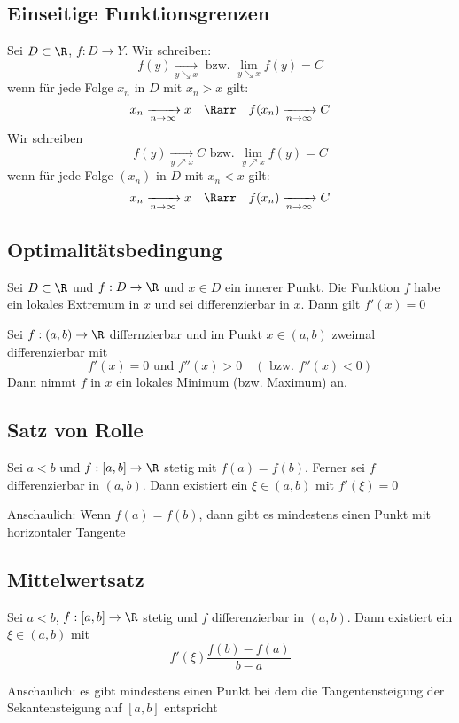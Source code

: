 	\subsection{Einseitige Funktionsgrenzen}
		\begin{Definition} 
			Sei $D\subset \R$, $f:D \to Y$. Wir schreiben:
			$$
				f(y)\xrightarrow[y\searrow x]{} \text{ bzw. } \lim_{y\searrow x}f(y) = C
			$$
			wenn für jede Folge $x_n$ in $D$ mit $x_n > x$ gilt:
			$$
				x_n \xrightarrow[n\to\infty]{}x \quad \Rarr \quad f(x_n)\xrightarrow[n\to\infty]{}C
			$$
			Wir schreiben
			$$
				f(y)\xrightarrow[y\nearrow x]{}C \text{ bzw. } \lim_{y\nearrow x}f(y)=C
			$$
			wenn für jede Folge $(x_n)$ in $D$ mit $x_n < x$ gilt:
			$$
				x_n\xrightarrow[n\to\infty]{}x \quad \Rarr \quad f(x_n)\xrightarrow[n\to\infty]{}C
			$$
		\end{Definition}
	\subsection{Optimalitätsbedingung}
		\begin{Satz} [ ]
			Sei $D\subset \R$ und $f: D \to \R$ und $x\in D$ ein innerer Punkt. Die Funktion $f$ habe ein lokales Extremum in $x$ und sei differenzierbar in $x$. Dann gilt $f'(x)=0$
		\end{Satz}
		\begin{Satz} [ ]
			Sei $f:(a, b)\to\R$ differnzierbar und im Punkt $x\in(a, b)$ zweimal differenzierbar mit
			$$
				f'(x)=0 \text{ und } f''(x)>0\quad(\text{ bzw. }f''(x)<0)
			$$
			Dann nimmt $f$ in $x$ ein lokales Minimum (bzw. Maximum) an.
		\end{Satz}
	\subsection{Satz von Rolle}
		\begin{Satz} [ Rolle]
			Sei $a < b$ und $f: [a, b]\to\R$ stetig mit $f(a) = f(b)$. Ferner sei $f$ differenzierbar in $(a, b)$. Dann existiert ein $\xi\in(a, b)$ mit $f'(\xi)=0$
		\end{Satz}
		Anschaulich: Wenn $f(a) = f(b)$, dann gibt es mindestens einen Punkt mit horizontaler Tangente		
	\subsection{Mittelwertsatz}
		\begin{Satz} [ Mittelwert]
			Sei $a<b$, $f:[a, b]\to\R$ stetig und $f$ differenzierbar in $(a, b)$. Dann existiert ein $\xi\in(a, b)$ mit
			$$
				f'(\xi)\frac{f(b)-f(a)}{b - a}
			$$
		\end{Satz}
		Anschaulich: es gibt mindestens einen Punkt bei dem die Tangentensteigung der Sekantensteigung auf $[a, b]$ entspricht

